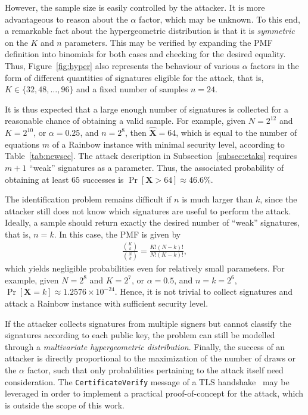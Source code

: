 \documentclass[12pt, a4paper, oneside]{memoir}
\theoremstyle{definition}
\begin{document}
However, the sample size is easily controlled by the attacker. It is more advantageous to reason about the $\alpha$ factor, which may be unknown. To this end, a remarkable fact about the hypergeometric distribution is that it is \emph{symmetric} on the $K$ and $n$ parameters. This may be verified by expanding the PMF definition into binomials for both cases and checking for the desired equality. Thus, Figure~\ref{fig:hyper} also represents the behaviour of various $\alpha$ factors in the form of different quantities of signatures eligible for the attack, that is, $K \in \{32, 48, \dots, 96\}$ and a fixed number of samples $n = 24$.

It is thus expected that a large enough number of signatures is collected for a reasonable chance of obtaining a valid sample. For example, given $N = 2^{12}$ and $K = 2^{10}$, or $\alpha = 0.25$, and $n = 2^{8}$, then $\hat{\mathbf{X}} = 64$, which is equal to the number of equations $m$ of a Rainbow instance with minimal security level, according to Table~\ref{tab:newsec}. The attack description in Subsection~\ref{subsec:etaks} requires $m + 1$ ``weak'' signatures as a parameter. Thus, the associated probability of obtaining at least $65$ successes is $\Pr[\mathbf{X} > 64] \approx 46.6\%$.

The identification problem remains difficult if $n$ is much larger than $k$, since the attacker still does not know which signatures are useful to perform the attack. Ideally, a sample should return exactly the desired number of ``weak'' signatures, that is, $n = k$. In this case, the PMF is given by
\begin{align}
  \frac{\binom{K}{k}}{\binom{N}{k}} = \frac{K! (N - k)!}{N! (K - k)!},
\end{align}
which yields negligible probabilities even for relatively small parameters. For example, given $N = 2^{8}$ and $K = 2^{7}$, or $\alpha = 0.5$, and $n = k = 2^{6}$, $\Pr[\mathbf{X} = k] \approx 1.2576 \times 10^{-24}$. Hence, it is not trivial to collect signatures and attack a Rainbow instance with sufficient security level.

If the attacker collects signatures from multiple signers but cannot classify the signatures according to each public key, the problem can still be modelled through a \emph{multivariate hypergeometric distribution}. Finally, the success of an attacker is directly proportional to the maximization of the number of draws or the $\alpha$ factor, such that only probabilities pertaining to the attack itself need consideration. The \texttt{CertificateVerify} message of a TLS handshake~\cite[Subsection~4.4.3]{Rescorla:201808} may be leveraged in order to implement a practical proof-of-concept for the attack, which is outside the scope of this work.
\end{document}
